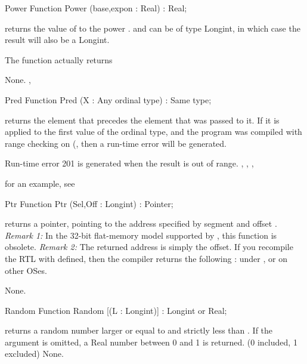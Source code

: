 \documentclass{report}
\begin{document}
\html{}
\begin{function}{Power}
\Declaration
Function Power (base,expon : Real) : Real;

\Description

 returns the value of  to the power .
 and  can be of type Longint, in which case the
result will also be a Longint.

The function actually returns 

\Errors
None.
\SeeAlso
{}, 
\end{function}
\html{}
\begin{function}{Pred}
\Declaration
Function Pred (X : Any ordinal type) : Same type;

\Description
  returns the element that precedes the element that was passed
to it. If it is applied to the first value of the ordinal type, and the
program was compiled with range checking on (, then a run-time
error will be generated.

\Errors
Run-time error 201 is generated when the result is out of
range.
\SeeAlso
{}, , , 
\end{function}
for an example, see 
\html{}
\begin{function}{Ptr}
\Declaration
Function Ptr (Sel,Off : Longint) : Pointer;

\Description

 returns a pointer, pointing to the address specified by
segment  and offset .
{\em Remark 1:} In the 32-bit flat-memory model supported by \fpc, this
function is obsolete.
{\em Remark 2:} The returned address is simply the offset. If you recompile
the RTL with  defined, then the compiler returns the
following :  under \dos, or
 on other OSes.

\Errors
None.
\SeeAlso
{}
\end{function}
\html{}
\begin{function}{Random}
\Declaration
Function Random [(L : Longint)] : Longint or Real;

\Description
{} returns a random number larger or equal to  and
strictly less than .
If the argument  is omitted, a Real number between 0 and 1 is returned.
(0 included, 1 excluded)
\Errors
None.
\SeeAlso
{}
\end{function}
\end{document}
